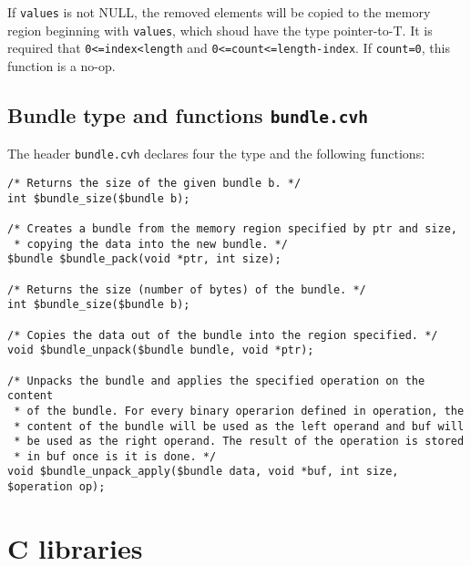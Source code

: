 If \texttt{values} is not NULL, the removed elements will be copied to the memory region beginning with \texttt{values}, which shoud have the type pointer-to-T. It is required that \texttt{0<=index<length} and \texttt{0<=count<=length-index}. If \texttt{count=0}, this function is a no-op.

\subsection{Bundle type and functions \texttt{bundle.cvh}}
\label{subsec:bundleLibrary}

The header \texttt{bundle.cvh} declares four the type \cbundle and the following functions:

\begin{verbatim}
/* Returns the size of the given bundle b. */
int $bundle_size($bundle b);

/* Creates a bundle from the memory region specified by ptr and size,
 * copying the data into the new bundle. */
$bundle $bundle_pack(void *ptr, int size);

/* Returns the size (number of bytes) of the bundle. */
int $bundle_size($bundle b);

/* Copies the data out of the bundle into the region specified. */
void $bundle_unpack($bundle bundle, void *ptr);

/* Unpacks the bundle and applies the specified operation on the content 
 * of the bundle. For every binary operarion defined in operation, the 
 * content of the bundle will be used as the left operand and buf will 
 * be used as the right operand. The result of the operation is stored 
 * in buf once is it is done. */
void $bundle_unpack_apply($bundle data, void *buf, int size, $operation op);

\end{verbatim}


\section{C libraries}


